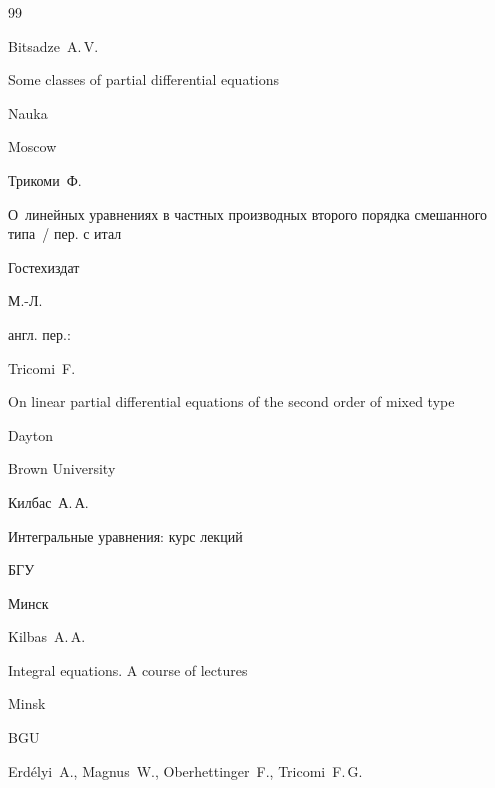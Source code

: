 \begin{thebibliography}{99}
\misctransl

\by Bitsadze~A.\,V.

\book Some classes of partial differential equations

\publ Nauka

\publaddr Moscow






\by Трикоми~Ф.

\book О~линейных уравнениях в частных производных второго порядка смешанного типа~/ пер. с итал

\publ Гостехиздат

\publaddr М.-Л.



\transl англ. пер.:~

\by Tricomi~F.

\book On linear partial differential equations of the second order of mixed type

\publaddr Dayton

\publ Brown University










\by Килбас~А.\,А.

\book Интегральные уравнения: курс лекций

\publ БГУ

\publaddr Минск



\misctransl

\by Kilbas~A.\,A.

\book Integral equations. A course of lectures

\publaddr Minsk

\publ BGU








\by Erd\'{e}lyi~A., Magnus~W., Oberhettinger~F., Tricomi~F.\,G.


\end{thebibliography}
